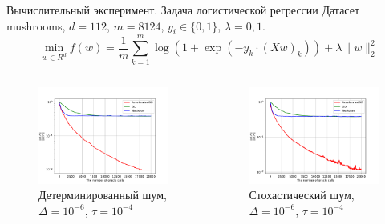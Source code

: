 \documentclass{beamer}
\begin{document}
\begin{frame}{Вычислительный эксперимент. Задача логистической регрессии}
Датасет mushrooms, $d = 112$, $m = 8124$, $y_i \in \{0, 1\}$, $\lambda = 0,1$.
$$ \min\limits_{w \in R^d} f(w) = \frac{1}{m}\sum\limits_{k = 1}^m \log(1 + \exp(-y_k \cdot (Xw)_k)) + \lambda \|w\|_2^2$$
\begin{columns}[c]
    \begin{figure}
    \includegraphics[width=1.0\textwidth]{Non_stochastic_Logreg_AGD_GD_Nesterov_18_1e-06_0.0001.pdf}
        \caption*{Детерминированный шум, $\Delta = 10^{-6}$, $\tau = 10^{-4}$}
    \end{figure}

    \begin{figure}
    \includegraphics[width=1.0\textwidth]{Stochastic_Logreg_AGD_GD_Nesterov_18_1e-06_0.0001.pdf}
        \caption*{Стохастический шум, $\Delta = 10^{-6}$, $\tau = 10^{-4}$}
    \end{figure}
\end{columns}
\end{frame}
\end{document}
